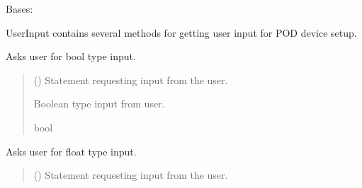 \documentclass[letterpaper,10pt,english]{sphinxmanual}
\begin{document}
\begin{fulllineitems}
\label{\detokenize{Setup.Inputs:Setup.Inputs.GetUserInput.UserInput}}
\pysigstartsignatures
{}
\pysigstopsignatures
\sphinxAtStartPar
Bases: 

\sphinxAtStartPar
UserInput contains several methods for getting user input for POD device setup.

\begin{fulllineitems}
\label{\detokenize{Setup.Inputs:Setup.Inputs.GetUserInput.UserInput.AskForBool}}
\pysigstartsignatures
{}
\pysigstopsignatures
\sphinxAtStartPar
Asks user for bool type input.
\begin{quote}\begin{description}
\sphinxAtStartPar
{} () \textendash{} Statement requesting input from the user.

\sphinxAtStartPar
Boolean type input from user.

\sphinxAtStartPar
bool

\end{description}\end{quote}

\end{fulllineitems}


\begin{fulllineitems}
\label{\detokenize{Setup.Inputs:Setup.Inputs.GetUserInput.UserInput.AskForFloat}}
\pysigstartsignatures
{}
\pysigstopsignatures
\sphinxAtStartPar
Asks user for float type input.
\begin{quote}\begin{description}
\sphinxAtStartPar
{} () \textendash{} Statement requesting input from the user.


\end{description}
\end{quote}
\end{fulllineitems}
\end{fulllineitems}
\end{document}
